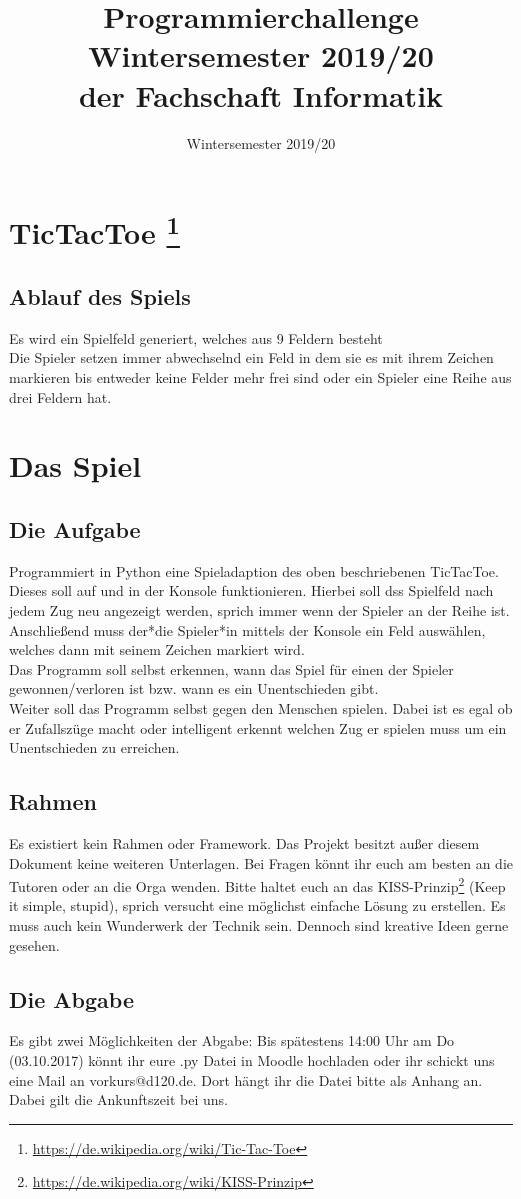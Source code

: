 \documentclass[accentcolor=tud3c,colorbacktitle,12pt]{tudexercise}
\begin{document}
\title{Programmierchallenge Wintersemester 2019/20 \\ {\small der Fachschaft Informatik}}
\subtitle{Wintersemester 2019/20}
\maketitle 
	
	\section*{TicTacToe \footnote[1]{\url{https://de.wikipedia.org/wiki/Tic-Tac-Toe}}}
	\subsection*{Ablauf des Spiels}
	Es wird ein Spielfeld generiert, welches aus 9 Feldern besteht \\
	
	Die Spieler setzen immer abwechselnd ein Feld in dem sie es mit ihrem Zeichen markieren bis entweder keine Felder mehr frei sind oder ein Spieler eine Reihe aus drei Feldern hat. \\
	
	
	\section{Das Spiel}
	\subsection*{Die Aufgabe}
	Programmiert in Python eine Spieladaption des oben beschriebenen TicTacToe. Dieses soll auf und in der Konsole funktionieren. Hierbei soll dss Spielfeld nach jedem Zug neu angezeigt werden, sprich immer wenn der Spieler an der Reihe ist. Anschließend muss der*die Spieler*in mittels der Konsole ein Feld auswählen, welches dann mit seinem Zeichen markiert wird. \\
	Das Programm soll selbst erkennen, wann das Spiel für einen der Spieler gewonnen/verloren ist bzw. wann es ein Unentschieden gibt. \\
	Weiter soll das Programm selbst gegen den Menschen spielen. Dabei ist es egal ob er Zufallszüge macht oder intelligent erkennt welchen Zug er spielen muss um ein Unentschieden zu erreichen.  
	
	\subsection*{Rahmen}
	Es existiert kein Rahmen oder Framework. Das Projekt besitzt außer diesem Dokument keine weiteren Unterlagen. Bei Fragen könnt ihr euch am besten an die Tutoren oder an die Orga wenden. Bitte haltet euch an das KISS-Prinzip\footnote[2]{\url{https://de.wikipedia.org/wiki/KISS-Prinzip}} (Keep it simple, stupid), sprich versucht eine möglichst einfache Lösung zu erstellen. Es muss auch kein Wunderwerk der Technik sein. Dennoch sind kreative Ideen gerne gesehen.
	
	\subsection*{Die Abgabe} 
	Es gibt zwei Möglichkeiten der Abgabe: Bis spätestens 14:00 Uhr am Do (03.10.2017) könnt ihr eure .py Datei in Moodle hochladen oder ihr schickt uns eine Mail an vorkurs@d120.de. Dort hängt ihr die Datei bitte als Anhang an. Dabei gilt die Ankunftszeit bei uns. 
	
\end{document}
